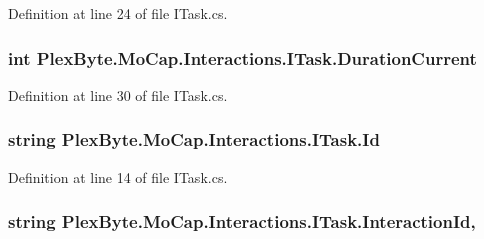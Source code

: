 Definition at line 24 of file I\+Task.\+cs.

\subsubsection[{\texorpdfstring{Duration\+Current}{DurationCurrent}}]{\setlength{\rightskip}{0pt plus 5cm}int Plex\+Byte.\+Mo\+Cap.\+Interactions.\+I\+Task.\+Duration\+Current\hspace{0.3cm}{\ttfamily [get]}}\hypertarget{interface_plex_byte_1_1_mo_cap_1_1_interactions_1_1_i_task_a8a3ed76e09b91a0332ce84629bdac670}{}\label{interface_plex_byte_1_1_mo_cap_1_1_interactions_1_1_i_task_a8a3ed76e09b91a0332ce84629bdac670}


Definition at line 30 of file I\+Task.\+cs.

\subsubsection[{\texorpdfstring{Id}{Id}}]{\setlength{\rightskip}{0pt plus 5cm}string Plex\+Byte.\+Mo\+Cap.\+Interactions.\+I\+Task.\+Id\hspace{0.3cm}{\ttfamily [get]}}\hypertarget{interface_plex_byte_1_1_mo_cap_1_1_interactions_1_1_i_task_a7e207370f422edc06071f3c288ac56a2}{}\label{interface_plex_byte_1_1_mo_cap_1_1_interactions_1_1_i_task_a7e207370f422edc06071f3c288ac56a2}


Definition at line 14 of file I\+Task.\+cs.

\subsubsection[{\texorpdfstring{Interaction\+Id}{InteractionId}}]{\setlength{\rightskip}{0pt plus 5cm}string Plex\+Byte.\+Mo\+Cap.\+Interactions.\+I\+Task.\+Interaction\+Id\hspace{0.3cm}{\ttfamily [get]}, {\ttfamily [set]}}\hypertarget{interface_plex_byte_1_1_mo_cap_1_1_interactions_1_1_i_task_afb97aa4ca4a2b2c1f1dc7bc38b08264e}{}\label{interface_plex_byte_1_1_mo_cap_1_1_interactions_1_1_i_task_afb97aa4ca4a2b2c1f1dc7bc38b08264e}


